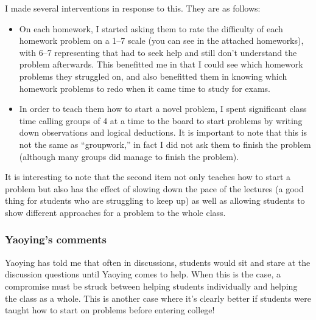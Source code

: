 \documentclass[11pt,oneside]{amsart}
\newcommand{\bE}{\mathbb{E}}
\DeclareMathOperator{\Var}{Var}
\begin{document}
I made several interventions in response to this. They are as follows:
\begin{itemize}
  \item On each homework, I started asking them to rate the difficulty of each homework problem on a 1--7 scale (you can see in the attached homeworks), with 6--7 representing that had to seek help and still don't understand the problem afterwards. This benefitted me in that I could see which homework problems they struggled on, and also benefitted them in knowing which homework problems to redo when it came time to study for exams.
  \item In order to teach them how to start a novel problem, I spent significant class time calling groups of 4 at a time to the board to start problems by writing down observations and logical deductions. It is important to note that this is not the same as ``groupwork,'' in fact I did not ask them to finish the problem (although many groups did manage to finish the problem).
\end{itemize}
It is interesting to note that the second item not only teaches how to start a problem but also has the effect of slowing down the pace of the lectures (a good thing for students who are struggling to keep up) as well as allowing students to show different approaches for a problem to the whole class.

\subsubsection{Yaoying's comments}
Yaoying has told me that often in discussions, students would sit and stare at the discussion questions until Yaoying comes to help. When this is the case, a compromise must be struck between helping students individually and helping the class as a whole. This is another case where it's clearly better if students were taught how to start on problems before entering college!


\end{document}
